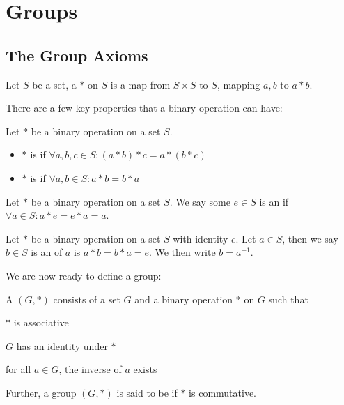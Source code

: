 \documentclass{styles/note}
\author{Jiaming (George) Yu}
\date{\today}
\begin{document}
\maketitle
\tableofcontents
\newpage




\section{Groups}
  
  \subsection{The Group Axioms}
    
    \begin{definition}{}{}
      Let $S$ be a set, a  $*$ on $S$ is a map from $S \times S$ to $S$, mapping $a, b$ to $a * b$.
    \end{definition}
    
    There are a few key properties that a binary operation can have:
    
    \begin{definition}{}{}
      Let $*$ be a binary operation on a set $S$.
      \begin{itemize}
        \item $*$ is  if $\forall a, b, c \in S: (a * b) * c = a * (b * c)$
        \item $*$ is  if $\forall a, b \in S: a * b = b * a$
      \end{itemize}
    \end{definition}
    
    \begin{definition}{}{}
      Let $*$ be a binary operation on a set $S$. We say some $e \in S$ is an  if $\forall a \in S: a * e = e * a = a$.
    \end{definition}
    
    \begin{definition}{}{}
      Let $*$ be a binary operation on a set $S$ with identity $e$. Let $a \in S$, then we say $b \in S$ is an  of $a$ is $a * b = b * a = e$. We then write $b = a^{-1}$.
    \end{definition}
    
    We are now ready to define a group:
    
    \begin{definition}{}{}
      A  $(G, *)$ consists of a set $G$ and a binary operation $*$ on $G$ such that
      \begin{romanenum}
        \item $*$ is associative
        \item $G$ has an identity under $*$
        \item for all $a \in G$, the inverse of $a$ exists
      \end{romanenum}
      Further, a group $(G, *)$ is said to be  if $*$ is commutative.
    \end{definition}
\end{document}
